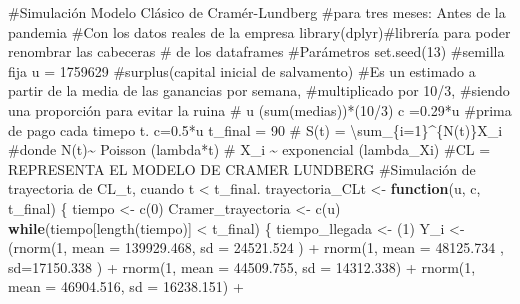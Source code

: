 \documentclass[
  us-letterpaper,
]{scrreprt}
\newenvironment{Shaded}{\begin{snugshade}}{\end{snugshade}}
\newcommand{\AttributeTok}[1]{\textcolor[rgb]{0.40,0.45,0.13}{#1}}
\newcommand{\CommentTok}[1]{\textcolor[rgb]{0.37,0.37,0.37}{#1}}
\newcommand{\ControlFlowTok}[1]{\textcolor[rgb]{0.00,0.23,0.31}{\textbf{#1}}}
\newcommand{\DecValTok}[1]{\textcolor[rgb]{0.68,0.00,0.00}{#1}}
\newcommand{\FloatTok}[1]{\textcolor[rgb]{0.68,0.00,0.00}{#1}}
\newcommand{\FunctionTok}[1]{\textcolor[rgb]{0.28,0.35,0.67}{#1}}
\newcommand{\NormalTok}[1]{\textcolor[rgb]{0.00,0.23,0.31}{#1}}
\newcommand{\OtherTok}[1]{\textcolor[rgb]{0.00,0.23,0.31}{#1}}
\newcommand{\SpecialCharTok}[1]{\textcolor[rgb]{0.37,0.37,0.37}{#1}}
\theoremstyle{plain}
\theoremstyle{plain}
\theoremstyle{definition}
\theoremstyle{remark}
\begin{document}
\begin{Shaded}
\begin{Highlighting}[]
\CommentTok{\#Simulación Modelo Clásico de Cramér{-}Lundberg }
\CommentTok{\#para tres meses: Antes de la pandemia}
\CommentTok{\#Con los datos reales de la empresa}
\FunctionTok{library}\NormalTok{(dplyr)}\CommentTok{\#librería para poder renombrar las cabeceras }
\CommentTok{\# de los dataframes}
\CommentTok{\#Parámetros}
\FunctionTok{set.seed}\NormalTok{(}\DecValTok{13}\NormalTok{) }\CommentTok{\#semilla fija}
\NormalTok{u }\OtherTok{=} \DecValTok{1759629} \CommentTok{\#surplus(capital inicial de salvamento)}
\CommentTok{\#Es un estimado a partir de la media de las ganancias por semana, }
\CommentTok{\#multiplicado por 10/3, }
\CommentTok{\#siendo una proporción para evitar la ruina}
\CommentTok{\# u (sum(medias))*(10/3)}
\NormalTok{c }\OtherTok{=}\FloatTok{0.29}\SpecialCharTok{*}\NormalTok{u }\CommentTok{\#prima de pago cada timepo t. c=0.5*u}
\NormalTok{t\_final }\OtherTok{=} \DecValTok{90}
\CommentTok{\# S(t) = \textbackslash{}sum\_\{i=1\}\^{}\{N(t)\}X\_i}
\CommentTok{\#donde N(t)\textasciitilde{} Poisson (lambda*t)}
\CommentTok{\# X\_i \textasciitilde{} exponencial (lambda\_Xi)}
\CommentTok{\#CL = REPRESENTA EL MODELO DE CRAMER LUNDBERG}
\CommentTok{\#Simulación de trayectoria de CL\_t, cuando t \textless{} t\_final.}
\NormalTok{trayectoria\_CLt }\OtherTok{\textless{}{-}} \ControlFlowTok{function}\NormalTok{(u, c, t\_final)}
\NormalTok{\{}
\NormalTok{  tiempo }\OtherTok{\textless{}{-}} \FunctionTok{c}\NormalTok{(}\DecValTok{0}\NormalTok{)}
\NormalTok{  Cramer\_trayectoria }\OtherTok{\textless{}{-}} \FunctionTok{c}\NormalTok{(u)}
  \ControlFlowTok{while}\NormalTok{(tiempo[}\FunctionTok{length}\NormalTok{(tiempo)] }\SpecialCharTok{\textless{}}\NormalTok{ t\_final)}
\NormalTok{  \{}
\NormalTok{    tiempo\_llegada }\OtherTok{\textless{}{-}}\NormalTok{ (}\DecValTok{1}\NormalTok{)}
\NormalTok{  Y\_i }\OtherTok{\textless{}{-}}\NormalTok{  (}\FunctionTok{rnorm}\NormalTok{(}\DecValTok{1}\NormalTok{, }\AttributeTok{mean =} \FloatTok{139929.468}\NormalTok{, }\AttributeTok{sd =} \FloatTok{24521.524}\NormalTok{ )  }\SpecialCharTok{+} 
            \FunctionTok{rnorm}\NormalTok{(}\DecValTok{1}\NormalTok{, }\AttributeTok{mean =} \FloatTok{48125.734}\NormalTok{ , }\AttributeTok{sd=}\FloatTok{17150.338}\NormalTok{ )   }\SpecialCharTok{+}  
            \FunctionTok{rnorm}\NormalTok{(}\DecValTok{1}\NormalTok{, }\AttributeTok{mean =}  \FloatTok{44509.755}\NormalTok{, }\AttributeTok{sd =} \FloatTok{14312.338}\NormalTok{)  }\SpecialCharTok{+} 
            \FunctionTok{rnorm}\NormalTok{(}\DecValTok{1}\NormalTok{, }\AttributeTok{mean =}   \FloatTok{46904.516}\NormalTok{, }\AttributeTok{sd =} \FloatTok{16238.151}\NormalTok{) }\SpecialCharTok{+} 

\end{Highlighting}
\end{Shaded}
\end{document}
